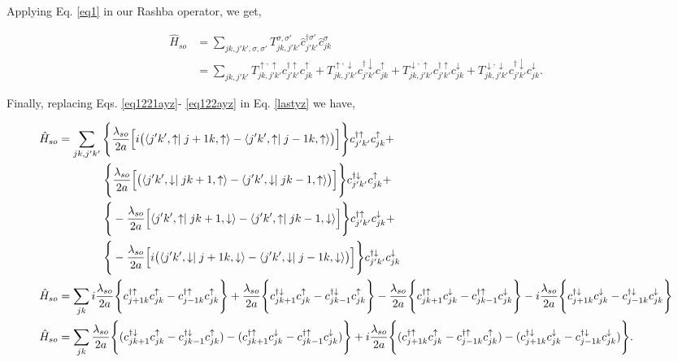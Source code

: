 \documentclass[10pt,prb,showpacs,amssymb,floatfix]{revtex4-1}
\newcommand{\nn}{\nonumber}
\begin{document}
Applying Eq. \eqref{eq1} in our Rashba operator, we get,

\begin{align}
\hat H_{so} &= \sum_{jk,j'k',\sigma,\sigma'} T_{jk,j'k'}^{\sigma,\sigma'} \hat{c}_{j'k'}^{\dagger \sigma'} \hat{c}_{jk}^\sigma \nn\\
&= \sum_{jk,j'k'} T_{jk,j'k'}^{\uparrow,\uparrow} c_{j'k'}^{\dagger \uparrow} c_{jk}^\uparrow +  T_{jk,j'k'}^{\uparrow,\downarrow} c_{j'k'}^{\dagger \downarrow} c_{jk}^\uparrow + T_{jk,j'k'}^{\downarrow,\uparrow} c_{j'k'}^{\dagger \uparrow} c_{jk}^\downarrow + T_{jk,j'k'}^{\downarrow,\downarrow} c_{j'k'}^{\dagger \downarrow} c_{jk}^\downarrow.
\label{lastyz}
\end{align}

Finally, replacing Eqs. \eqref{eq1221ayz}- \eqref{eq122ayz} in Eq. \eqref{lastyz} we have,

\begin{align}
\label{last20}
\hat H_{so} &= \sum_{jk,j'k'} \Bigg{\{}  \frac{\lambda_{so}}{2a} \Big{[} i \big{(} \langle j'k',\uparrow \mid  j+1k,\uparrow \rangle - \langle j'k',\uparrow \mid j-1k,\uparrow \rangle \big{)}  \Big{]}  \Bigg{\}} c_{j'k'}^{\dagger \uparrow} c_{jk}^\uparrow + \nn\\ &~~~~~~~~~~~~\Bigg{\{} \frac{\lambda_{so}}{2a} \Big{[}  \big{(} \langle j'k',\downarrow \mid  jk+1,\uparrow \rangle - \langle j'k',\downarrow \mid jk-1,\uparrow \rangle \big{)} \Big{]} \Bigg{\}} c_{j'k'}^{\dagger \downarrow} c_{jk}^\uparrow + \nn\\ 
&~~~~~~~~~~~~\Bigg{\{} -\frac{\lambda_{so}}{2a} \Big{[} \langle j'k',\uparrow \mid jk+1,\downarrow \rangle -  \langle j'k',\uparrow \mid jk-1,\downarrow \rangle  \Big{]} \Bigg{\}} c_{j'k'}^{\dagger \uparrow} c_{jk}^\downarrow + \nn\\ 
&~~~~~~~~~~~~\Bigg{\{} -\frac{\lambda_{so}}{2a} \Big{[} i \big{(} \langle j'k',\downarrow \mid  j+1k,\downarrow \rangle - \langle j'k',\downarrow \mid j-1k,\downarrow \rangle \big{)}  \Big{]}  \Bigg{\}} c_{j'k'}^{\dagger \downarrow} c_{jk}^\downarrow \\
\hat H_{so} &= \sum_{jk} i\frac{\lambda_{so}}{2a}\Bigg{\{} c_{j+1k}^{\dagger \uparrow} c_{jk}^\uparrow  - c_{j-1k}^{\dagger \uparrow} c_{jk}^\uparrow\Bigg{\}} + \frac{\lambda_{so}}{2a} \Bigg{\{} c_{jk+1}^{\dagger \downarrow} c_{jk}^\uparrow  - c_{jk-1}^{\dagger \downarrow} c_{jk}^\uparrow \Bigg{\}} - \frac{\lambda_{so}}{2a} \Bigg{\{} c_{jk+1}^{\dagger \uparrow} c_{jk}^\downarrow  - c_{jk-1}^{\dagger \uparrow} c_{jk}^\downarrow  \Bigg{\}} - i\frac{\lambda_{so}}{2a}\Bigg{\{}  c_{j+1k}^{\dagger \downarrow} c_{jk}^\downarrow - c_{j-1k}^{\dagger \downarrow} c_{jk}^\downarrow\Bigg{\}}  \\
\hat H_{so} &= \sum_{jk} \frac{\lambda_{so}}{2a}  \Bigg{\{}   (c_{jk+1}^{\dagger \downarrow} c_{jk}^\uparrow  - c_{jk-1}^{\dagger \downarrow} c_{jk}^\uparrow) - ( c_{jk+1}^{\dagger \uparrow} c_{jk}^\downarrow  - c_{jk-1}^{\dagger \uparrow} c_{jk}^\downarrow ) \Bigg{\}}  +i\frac{\lambda_{so}}{2a} \Bigg{\{}  (c_{j+1k}^{\dagger \uparrow} c_{jk}^\uparrow  - c_{j-1k}^{\dagger \uparrow} c_{jk}^\uparrow) -  ( c_{j+1k}^{\dagger \downarrow} c_{jk}^\downarrow - c_{j-1k}^{\dagger \downarrow} c_{jk}^\downarrow) \Bigg{\}}. 
\label{last2yz}
\end{align}
\end{document}
